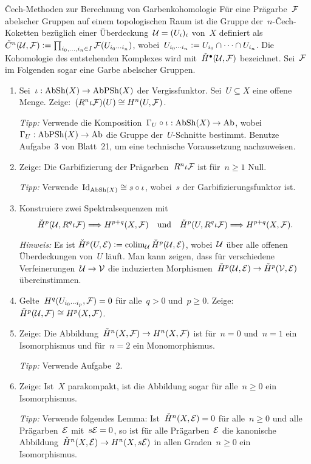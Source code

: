 \documentclass{uebblatt}
\begin{document}

\begin{aufgabe}{Čech-Methoden zur Berechnung von Garbenkohomologie}
Für eine Prägarbe~$\mathcal{F}$ abelscher Gruppen auf einem topologischen Raum ist die
Gruppe der~$n$-Čech-Koketten bezüglich einer Überdeckung~$\mathcal{U} = (U_i)_i$ von~$X$
definiert als~$\check C^n(\mathcal{U}, \mathcal{F}) \vcentcolon= \prod_{i_0,\ldots,i_n \in I}
\mathcal{F}(U_{i_0 \cdots i_n})$, wobei~$U_{i_0 \cdots i_n} \vcentcolon= U_{i_0} \cap \cdots
\cap U_{i_n}$. Die Kohomologie des entstehenden Komplexes wird mit~$\check
H^\bullet(\mathcal{U}, \mathcal{F})$ bezeichnet. Sei~$\mathcal{F}$ im Folgenden sogar eine Garbe abelscher Gruppen.
\begin{enumerate}
\item Sei~$\iota : \mathrm{AbSh}(X) \to
\mathrm{AbPSh}(X)$ der Vergissfunktor. Sei~$U \subseteq X$ eine offene Menge.
Zeige:~$(R^n \iota\mathcal{F})(U) \cong H^n(U, \mathcal{F})$.

{\tiny\emph{Tipp:} Verwende die Komposition~$\Gamma_U
\circ \iota : \mathrm{AbSh}(X) \to \mathrm{Ab}$, wobei~$\Gamma_U : \mathrm{AbPSh}(X) \to \mathrm{Ab}$ die
Gruppe der~$U$-Schnitte bestimmt. Benutze Aufgabe~3 von Blatt~21, um eine
technische Voraussetzung nachzuweisen.\par}
\item Zeige: Die Garbifizierung der Prägarben~$R^n \iota \mathcal{F}$ ist für~$n \geq 1$
Null.

{\tiny\emph{Tipp:} Verwende~$\mathrm{Id}_{\mathrm{AbSh}(X)} \cong s \circ \iota$, wobei~$s$ der Garbifizierungsfunktor
ist.\par}
\item Konstruiere zwei Spektralsequenzen mit
\[ \check H^p(\mathcal{U}, R^q \iota \mathcal{F}) \Longrightarrow H^{p+q}(X, \mathcal{F})
  \quad\text{und}\quad
  \check H^p(U, R^q \iota \mathcal{F}) \Longrightarrow H^{p+q}(X, \mathcal{F}). \]
{\tiny\emph{Hinweis:} Es ist $\check H^p(U,\mathcal{E}) \vcentcolon= \operatorname{colim}_{\mathcal{U}} \check H^p(\mathcal{U},\mathcal{E})$,
wobei~$\mathcal{U}$ über alle offenen Überdeckungen von~$U$ läuft. Man kann zeigen, dass
für verschiedene Verfeinerungen~$\mathcal{U} \to \mathcal{V}$ die induzierten
Morphismen~$\check H^p(\mathcal{U},\mathcal{E}) \to \check H^p(\mathcal{V},\mathcal{E})$ übereinstimmen.\par}
\item Gelte~$H^q(U_{i_0 \cdots i_p}, \mathcal{F}) = 0$ für alle~$q > 0$ und~$p \geq 0$.
Zeige: $\check H^p(\mathcal{U}, \mathcal{F}) \cong H^p(X, \mathcal{F})$.
\item Zeige: Die Abbildung~$\check H^n(X,\mathcal{F}) \to H^n(X,\mathcal{F})$ ist für~$n = 0$
und~$n = 1$ ein Isomorphismus und für~$n = 2$ ein Monomorphismus.
{\tiny\emph{Tipp:} Verwende Aufgabe~2.\par}
\item Zeige: Ist~$X$ parakompakt, ist die Abbildung sogar für alle~$n \geq 0$ ein
Isomorphismus.

{\tiny\emph{Tipp:} Verwende folgendes Lemma: Ist~$\check H^n(X,\mathcal{E}) = 0$ für
alle~$n \geq 0$ und alle Prägarben~$\mathcal{E}$ mit~$s\mathcal{E} = 0$, so ist für alle
Prägarben~$\mathcal{E}$ die kanonische Abbildung~$\check H^n(X,\mathcal{E}) \to H^n(X,s\mathcal{E})$ in
allen Graden~$n \geq 0$ ein Isomorphismus.\par}
\end{enumerate}
\end{aufgabe}
\end{document}
